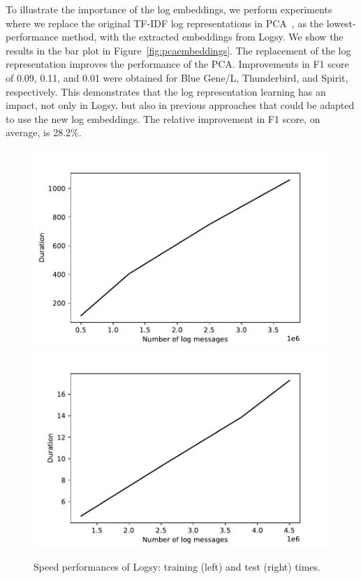 To illustrate the importance of the log embeddings, we perform experiments where we replace the original TF-IDF log representations in PCA~\cite{xu2009detecting}, as the lowest-performance method, with the extracted embeddings from Logsy. We show the results in the bar plot in Figure~\ref{fig:pcaembeddings}. The replacement of the log representation improves the performance of the PCA. Improvements in F1 score of 0.09, 0.11, and 0.01 were obtained for Blue Gene/L, Thunderbird, and Spirit, respectively. This demonstrates that the log representation learning has an impact, not only in Logsy, but also in previous approaches that could be adapted to use the new log embeddings. The relative improvement in F1 score, on average, is 28.2\%.


\begin{figure}[!htbp]
  \includegraphics[width=1.0\textwidth]{gfx/chap5/logsyspeedgputrain.pdf}
\endminipage\hfill
{}
  \includegraphics[width=1.0\textwidth]{gfx/chap5/logsyspeedgputest.pdf}
\endminipage
\caption{Speed performances of Logsy: training (left) and test (right) times.}
\label{fig:speedlogsy}
\end{figure}



